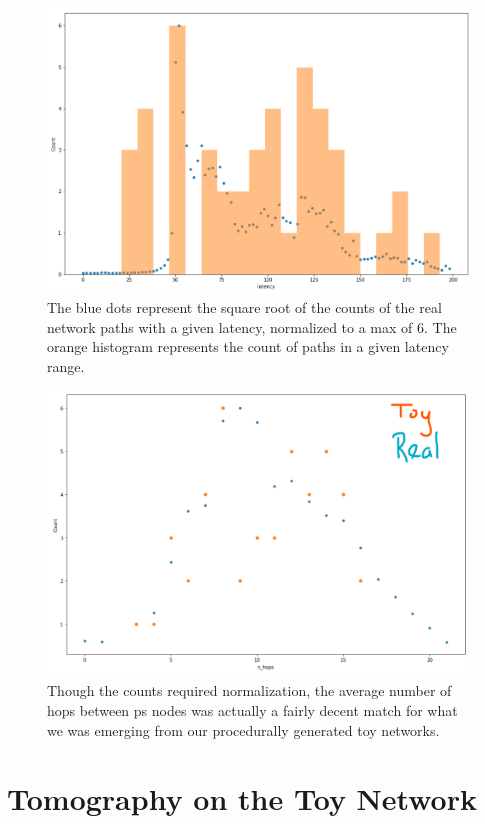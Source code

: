 \documentclass{finalreport}
\begin{document}
\begin{figure}[!ht]
\centering
\includegraphics[width=.85\linewidth]{week_4/ToyLatencyHist.png}
\caption{The blue dots represent the square root of the counts of the real network paths with a given \gls{latency}, normalized to a max of 6. The orange histogram represents the count of paths in a given \gls{latency} range.}
\end{figure}


\begin{figure}[!ht]
\centering
\includegraphics[width=.85\linewidth]{week_4/Hops.png}
\caption{Though the counts required normalization, the average number of \glspl{hop} between \gls{ps} nodes was actually a fairly decent match for what we was emerging from our procedurally generated toy networks.}
\end{figure}

\pagebreak
\section*{Tomography on the Toy Network}
\end{document}
